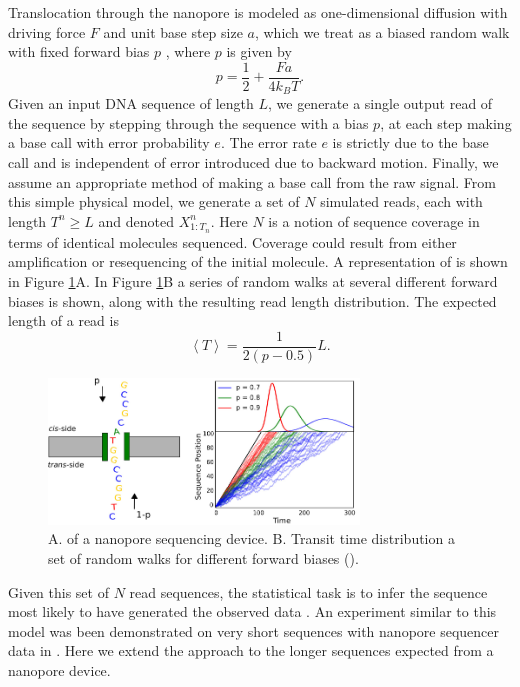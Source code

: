 \documentclass{biophys_letter}
\begin{document}
Translocation through the nanopore is modeled as one-dimensional diffusion with driving force $F$ and unit base step size $a$, which we treat as a biased random walk with fixed forward bias $p$ \cite{Berg:1993}, where $p$ is given by
\begin{equation}
p = \frac{1}{2} + \frac{Fa}{4k_{B}T}.
\end{equation}
Given an input DNA sequence of length $L$, we generate a single output read of the sequence by stepping through the sequence with a bias $p$, at each step making a base call with error probability $e$.
The error rate $e$ is strictly due to the base call and is independent of error introduced due to backward motion. 
Finally, we assume an appropriate method of making a base call from the raw signal.
From this simple physical model, we generate a set of $N$ simulated reads, each with length $T^{n} \ge L$ and denoted $X^n_{1:T_n}$.
Here $N$ is a notion of sequence coverage in terms of identical molecules sequenced.
Coverage could result from either amplification or resequencing of the initial molecule.
A  representation of  is shown in Figure \ref{fig:fig1}A.
In Figure \ref{fig:fig1}B a series of random walks at several different forward biases is shown, along with the resulting read length distribution.
The expected length of a read is 
\begin{equation}
  \left\langle T  \right\rangle = \frac{1}{2(p-0.5)} L.
\end{equation}

\begin{figure}%
  \centering
  \includegraphics[width=3.25in]{fig/fig1-withcartoon-jw-eps2pdf-cropped.pdf}
  \caption{A.  of a nanopore sequencing device. B. Transit time distribution  a set of random walks for different forward biases ().}
  \label{fig:fig1}
\end{figure}

Given this set of $N$ read sequences, the statistical task is to infer the  sequence most likely to have generated the observed data .
An experiment similar to this model was been demonstrated on very short sequences with nanopore sequencer data in \cite{Ohshiro:2012}.
Here we extend the approach to the longer sequences expected from a nanopore device.
\end{document}
